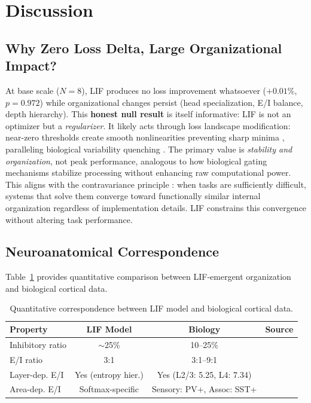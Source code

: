 \documentclass[11pt]{article}
\begin{document}
\section{Discussion}

\subsection{Why Zero Loss Delta, Large Organizational Impact?}

At base scale ($N{=}8$), LIF produces no loss improvement whatsoever ($+0.01\%$, $p = 0.972$) while organizational changes persist (head specialization, E/I balance, depth hierarchy). This \textbf{honest null result} is itself informative: LIF is not an optimizer but a \emph{regularizer}. It likely acts through loss landscape modification: near-zero thresholds create smooth nonlinearities preventing sharp minima \cite{hochreiter1997flat,keskar2017large}, paralleling biological variability quenching \cite{churchland2010stimulus}. The primary value is \emph{stability and organization}, not peak performance, analogous to how biological gating mechanisms stabilize processing without enhancing raw computational power. This aligns with the contravariance principle \cite{cao2024contravariance}: when tasks are sufficiently difficult, systems that solve them converge toward functionally similar internal organization regardless of implementation details. LIF constrains this convergence without altering task performance.

\subsection{Neuroanatomical Correspondence}
\label{sec:neuroanatomy}

Table~\ref{tab:bio-comparison} provides quantitative comparison between LIF-emergent organization and biological cortical data.

\begin{table}[h]
\centering
\caption{Quantitative correspondence between LIF model and biological cortical data.}
\label{tab:bio-comparison}
\begin{tabular}{lccc}
\toprule
\textbf{Property} & \textbf{LIF Model} & \textbf{Biology} & \textbf{Source} \\
\midrule
Inhibitory ratio & $\sim$25\% & 10--25\% & \cite{alizadeh2024ei} \\
E/I ratio & 3:1 & 3:1--9:1 & \cite{alizadeh2024ei} \\
Layer-dep. E/I & Yes (entropy hier.) & Yes (L2/3: 5.25, L4: 7.34) & \cite{alizadeh2025layer} \\
Area-dep. E/I & Softmax-specific & Sensory: PV+, Assoc: SST+ & \cite{wang2020macroscale} \\
\bottomrule
\end{tabular}
\end{table}
\end{document}
